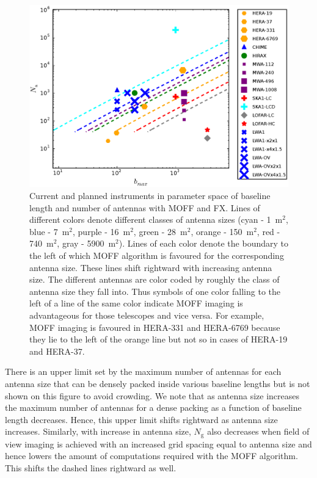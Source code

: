 \documentclass[a4paper,fleqn,usenatbib]{mnras}
\newcommand{\Ngrid}{N_\textrm{g}}
\begin{document}
\begin{figure}
  \includegraphics[width=\columnwidth]{figure12}
  \caption{Current and planned instruments in parameter space of baseline length and number of antennas with MOFF and FX. Lines of different colors denote different classes of antenna sizes (cyan - 1~m$^2$, blue - 7~m$^2$, purple - 16~m$^2$, green - 28~m$^2$, orange - 150~m$^2$, red - 740~m$^2$, gray - 5900~m$^2$). Lines of each color denote the boundary to the left of which MOFF algorithm is favoured for the corresponding antenna size. These lines shift rightward with increasing antenna size. The different antennas are color coded by roughly the class of antenna size they fall into. Thus symbols of one color falling to the left of a line of the same color indicate MOFF imaging is advantageous for those telescopes and vice versa. For example, MOFF imaging is favoured in HERA-331 and HERA-6769 because they lie to the left of the orange line but not so in cases of HERA-19 and HERA-37.}
  \label{fig:parameter-space-bll-nant-instruments}
\end{figure}

There is an upper limit set by the maximum number of antennas for each antenna size that can be densely packed inside various baseline lengths but is not shown on this figure to avoid crowding. We note that as antenna size increases the maximum number of antennas for a dense packing as a function of baseline length decreases. Hence, this upper limit shifts rightward as antenna size increases. Similarly, with increase in antenna size, $\Ngrid$ also decreases when field of view imaging is achieved with an increased grid spacing equal to antenna size and hence lowers the amount of computations required with the MOFF algorithm. This shifts the dashed lines rightward as well. 
\end{document}
